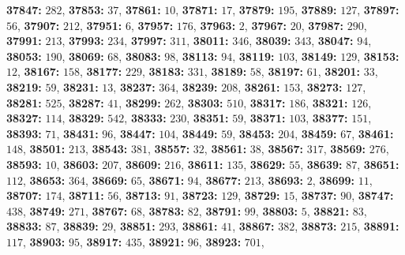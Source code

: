 \textsf{\bfseries 37847:} $282$, \textsf{\bfseries 37853:} $37$, \textsf{\bfseries 37861:} $10$, \textsf{\bfseries 37871:} $17$, \textsf{\bfseries 37879:} $195$, \textsf{\bfseries 37889:} $127$, \textsf{\bfseries 37897:} $56$, \textsf{\bfseries 37907:} $212$, \textsf{\bfseries 37951:} $6$, \textsf{\bfseries 37957:} $176$, \textsf{\bfseries 37963:} $2$, \textsf{\bfseries 37967:} $20$, \textsf{\bfseries 37987:} $290$, \textsf{\bfseries 37991:} $213$, \textsf{\bfseries 37993:} $234$, \textsf{\bfseries 37997:} $311$, \textsf{\bfseries 38011:} $346$, \textsf{\bfseries 38039:} $343$, \textsf{\bfseries 38047:} $94$, \textsf{\bfseries 38053:} $190$, \textsf{\bfseries 38069:} $68$, \textsf{\bfseries 38083:} $98$, \textsf{\bfseries 38113:} $94$, \textsf{\bfseries 38119:} $103$, \textsf{\bfseries 38149:} $129$, \textsf{\bfseries 38153:} $12$, \textsf{\bfseries 38167:} $158$, \textsf{\bfseries 38177:} $229$, \textsf{\bfseries 38183:} $331$, \textsf{\bfseries 38189:} $58$, \textsf{\bfseries 38197:} $61$, \textsf{\bfseries 38201:} $33$, \textsf{\bfseries 38219:} $59$, \textsf{\bfseries 38231:} $13$, \textsf{\bfseries 38237:} $364$, \textsf{\bfseries 38239:} $208$, \textsf{\bfseries 38261:} $153$, \textsf{\bfseries 38273:} $127$, \textsf{\bfseries 38281:} $525$, \textsf{\bfseries 38287:} $41$, \textsf{\bfseries 38299:} $262$, \textsf{\bfseries 38303:} $510$, \textsf{\bfseries 38317:} $186$, \textsf{\bfseries 38321:} $126$, \textsf{\bfseries 38327:} $114$, \textsf{\bfseries 38329:} $542$, \textsf{\bfseries 38333:} $230$, \textsf{\bfseries 38351:} $59$, \textsf{\bfseries 38371:} $103$, \textsf{\bfseries 38377:} $151$, \textsf{\bfseries 38393:} $71$, \textsf{\bfseries 38431:} $96$, \textsf{\bfseries 38447:} $104$, \textsf{\bfseries 38449:} $59$, \textsf{\bfseries 38453:} $204$, \textsf{\bfseries 38459:} $67$, \textsf{\bfseries 38461:} $148$, \textsf{\bfseries 38501:} $213$, \textsf{\bfseries 38543:} $381$, \textsf{\bfseries 38557:} $32$, \textsf{\bfseries 38561:} $38$, \textsf{\bfseries 38567:} $317$, \textsf{\bfseries 38569:} $276$, \textsf{\bfseries 38593:} $10$, \textsf{\bfseries 38603:} $207$, \textsf{\bfseries 38609:} $216$, \textsf{\bfseries 38611:} $135$, \textsf{\bfseries 38629:} $55$, \textsf{\bfseries 38639:} $87$, \textsf{\bfseries 38651:} $112$, \textsf{\bfseries 38653:} $364$, \textsf{\bfseries 38669:} $65$, \textsf{\bfseries 38671:} $94$, \textsf{\bfseries 38677:} $213$, \textsf{\bfseries 38693:} $2$, \textsf{\bfseries 38699:} $11$, \textsf{\bfseries 38707:} $174$, \textsf{\bfseries 38711:} $56$, \textsf{\bfseries 38713:} $91$, \textsf{\bfseries 38723:} $129$, \textsf{\bfseries 38729:} $15$, \textsf{\bfseries 38737:} $90$, \textsf{\bfseries 38747:} $438$, \textsf{\bfseries 38749:} $271$, \textsf{\bfseries 38767:} $68$, \textsf{\bfseries 38783:} $82$, \textsf{\bfseries 38791:} $99$, \textsf{\bfseries 38803:} $5$, \textsf{\bfseries 38821:} $83$, \textsf{\bfseries 38833:} $87$, \textsf{\bfseries 38839:} $29$, \textsf{\bfseries 38851:} $293$, \textsf{\bfseries 38861:} $41$, \textsf{\bfseries 38867:} $382$, \textsf{\bfseries 38873:} $215$, \textsf{\bfseries 38891:} $117$, \textsf{\bfseries 38903:} $95$, \textsf{\bfseries 38917:} $435$, \textsf{\bfseries 38921:} $96$, \textsf{\bfseries 38923:} $701$, 
